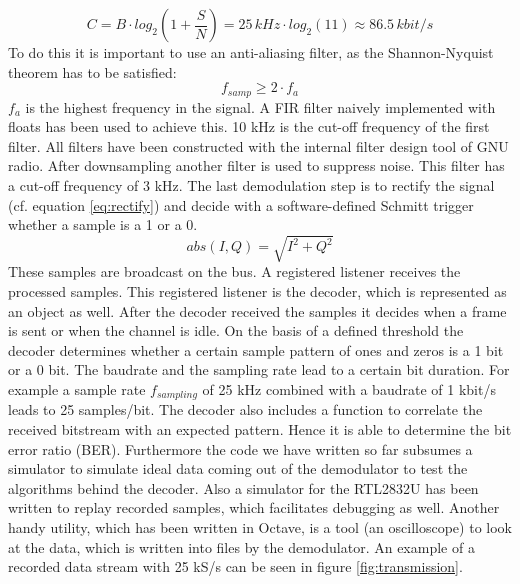 \documentclass[conference]{IEEEtran}
\begin{document}
\begin{equation}
	\label{eq:awgn}
	C=B \cdot log_2(1+\frac{S}{N})= 25\,kHz \cdot log_2(11) \approx 86.5\,kbit/s
\end{equation}     
To do this it is important to use an anti-aliasing filter, as the Shannon-Nyquist theorem has to be satisfied: 
\begin{equation}
	\label{eq:nyquist}
	f_{samp} \geq 2 \cdot f_{a}
\end{equation}
\ensuremath{f_{a}} is the highest frequency in the signal. 
A FIR filter naively implemented with floats has been used to achieve this. 10 kHz is the cut-off frequency of the first filter. All filters have been constructed with the internal filter design tool of GNU radio. After downsampling another filter is used to suppress noise. This filter has a cut-off frequency of 3 kHz. The last demodulation step is to rectify the signal (cf. equation \ref{eq:rectify}) and decide with a software-defined Schmitt trigger whether a sample is a 1 or a 0.
\begin{equation}
	\label{eq:rectify}
	abs(I,Q) = \sqrt{I^2 +  Q^2}
\end{equation} 
These samples are broadcast on the bus. A registered listener receives the processed samples. This registered listener is the decoder, which is represented as an object as well. After the decoder received the samples it decides when a frame is sent or when the channel is idle. On the basis of a defined threshold the decoder determines whether a certain sample pattern of ones and zeros is a 1 bit or a 0 bit. The baudrate and the sampling rate lead to a certain bit duration. For example a sample rate \ensuremath{f_{sampling}} of 25 kHz combined with a baudrate of 1 kbit/s leads to 25 samples/bit. The decoder also includes a function to correlate the received bitstream with an expected pattern. Hence it is able to determine the bit error ratio (BER). 
Furthermore the code we have written so far subsumes a simulator to simulate ideal data coming out of the demodulator to test the algorithms behind the decoder. Also a simulator for the RTL2832U has been written to replay recorded samples, which facilitates debugging as well.    
Another handy utility, which has been written in Octave, is a tool (an oscilloscope) to look at the data, which is written into files by the demodulator. An example of a recorded data stream with 25 kS/s can be seen in figure \ref{fig:transmission}. 
\end{document}
